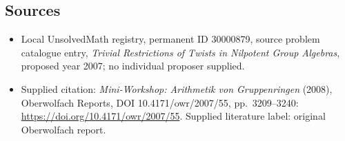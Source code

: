 \documentclass[11pt]{article}
\begin{document}
\subsection{Sources}
\begin{itemize}\item Local UnsolvedMath registry, permanent ID 30000879, source problem catalogue entry, \emph{Trivial Restrictions of Twists in Nilpotent Group Algebras}, proposed year 2007; no individual proposer supplied.\item Supplied citation: \emph{Mini-Workshop: Arithmetik von Gruppenringen} (2008), Oberwolfach Reports, DOI 10.4171/owr/2007/55, pp.\ 3209--3240: \url{https://doi.org/10.4171/owr/2007/55}. Supplied literature label: original Oberwolfach report.\end{itemize}
\end{document}
